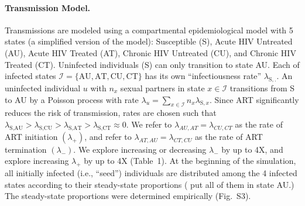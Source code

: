 \documentclass[a4paper,11pt]{article}
\newcommand{\authorcite}[1]{\citeauthor{#1}\supercite{#1}}
\begin{document}
\paragraph{Transmission Model.}
Transmissions are modeled using a compartmental epidemiological model with 5 states (a simplified version of the \authorcite{Granich2009} model): Susceptible (S), Acute HIV Untreated (AU), Acute HIV Treated (AT), Chronic HIV Untreated (CU), and Chronic HIV Treated (CT). Uninfected individuals (S) %
can only transition to state AU. 
Each of infected states $\mathcal{I} = \{\text{AU},\text{AT},\text{CU},\text{CT}\}$
has its own ``infectiousness rate'' $\lambda_{\text{S},.}$. %
An uninfected individual $u$ %
with $n_x$ sexual partners in state $x\in\mathcal{I}$ transitions from S to AU by a Poisson process with rate $\lambda_u=\sum_{x\in\mathcal{I}}{n_{x}\lambda_{\text{S},x}}$. Since ART significantly reduces the risk of transmission, rates are chosen such that $\lambda_{\text{S},\text{AU}} > \lambda_{\text{S},\text{CU}} > \lambda_{\text{S},\text{AT}} > \lambda_{\text{S},\text{CT}} \approx 0$. 
We refer to $\lambda_{AU,AT}=\lambda_{CU,CT}$ as the rate of ART initiation $(\lambda_+)$, and refer to $\lambda_{AT,AU}=\lambda_{CT,CU}$ as the rate of ART termination $(\lambda_-)$. 
We explore increasing or decreasing $\lambda_-$ by up to 4X, and explore increasing $\lambda_+$ by up to 4X (Table~1). 
At the beginning of the  simulation, %
all initially infected (i.e., ``seed'') individuals are distributed among the 4 infected states according to their steady-state proportions %
(\authorcite{Moshiri2018} %
put all of them in state AU.)
The steady-state proportions were determined empirically (Fig.~S3).
\end{document}
